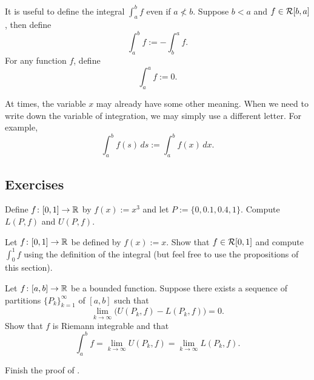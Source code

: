 It is useful to define the integral $\int_a^b f$ even if
$a \not< b$.  Suppose $b < a$ and $f \in {\mathcal{R}}[b,a]$,
then define
\begin{equation*}
\int_a^b f := - \int_b^a f .
\end{equation*}
For any function $f$, define
\begin{equation*}
\int_a^a f := 0 .
\end{equation*}

At times, the variable $x$ may already have some other meaning.  When
we need to write down the variable of integration, we may simply
use a different letter.  For example,
\begin{equation*}
\int_a^b f(s)\,ds := \int_a^b f(x)\,dx .
\end{equation*}

\subsection{Exercises}

\begin{exercise}
Define $f \colon [0,1] \to {\mathbb{R}}$ by $f(x) := x^3$
and let $P := \{ 0, 0.1, 0.4, 1 \}$.  Compute $L(P,f)$ and $U(P,f)$.
\end{exercise}

\begin{exercise}
Let $f \colon [0,1] \to {\mathbb{R}}$ be defined by $f(x) := x$.
Show that $f \in {\mathcal{R}}[0,1]$ and
compute $\int_0^1 f$ using the definition of the integral
(but
feel free to use the propositions of this section).%
\end{exercise}

\begin{exercise}
Let $f \colon [a,b] \to {\mathbb{R}}$ be a bounded function.
Suppose there exists a sequence of partitions $\{ P_k \}_{k=1}^\infty$ of $[a,b]$
such that
\begin{equation*}
\lim_{k \to \infty} \bigl( U(P_k,f) - L(P_k,f) \bigr) = 0 .
\end{equation*}
Show that $f$ is Riemann integrable and that
\begin{equation*}
\int_a^b f = 
\lim_{k \to \infty} U(P_k,f)
=
\lim_{k \to \infty} L(P_k,f) .
\end{equation*}
\end{exercise}

\begin{exercise}
Finish the proof of .
\end{exercise}

